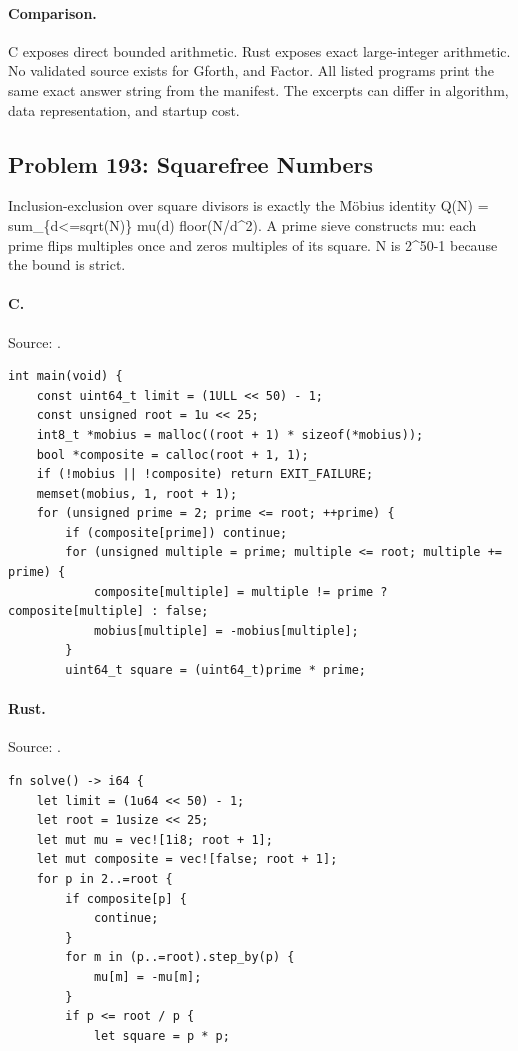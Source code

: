 \paragraph{Comparison.}
C exposes direct bounded arithmetic. Rust exposes exact large-integer arithmetic.
No validated source exists for Gforth, and Factor.
All listed programs print the same exact answer string from the manifest. The excerpts can differ in algorithm, data representation, and startup cost.

\subsection{Problem 193: Squarefree Numbers}
\label{walkthrough:p193}
Inclusion-exclusion over square divisors is exactly the Möbius identity Q(N) = sum\_\{d<=sqrt(N)\} mu(d) floor(N/d\textasciicircum{}2). A prime sieve constructs mu: each prime flips multiples once and zeros multiples of its square. N is 2\textasciicircum{}50-1 because the bound is strict.

\paragraph{C.} Source: .
\begin{lstlisting}
int main(void) {
    const uint64_t limit = (1ULL << 50) - 1;
    const unsigned root = 1u << 25;
    int8_t *mobius = malloc((root + 1) * sizeof(*mobius));
    bool *composite = calloc(root + 1, 1);
    if (!mobius || !composite) return EXIT_FAILURE;
    memset(mobius, 1, root + 1);
    for (unsigned prime = 2; prime <= root; ++prime) {
        if (composite[prime]) continue;
        for (unsigned multiple = prime; multiple <= root; multiple += prime) {
            composite[multiple] = multiple != prime ? composite[multiple] : false;
            mobius[multiple] = -mobius[multiple];
        }
        uint64_t square = (uint64_t)prime * prime;
\end{lstlisting}

\paragraph{Rust.} Source: .
\begin{lstlisting}
fn solve() -> i64 {
    let limit = (1u64 << 50) - 1;
    let root = 1usize << 25;
    let mut mu = vec![1i8; root + 1];
    let mut composite = vec![false; root + 1];
    for p in 2..=root {
        if composite[p] {
            continue;
        }
        for m in (p..=root).step_by(p) {
            mu[m] = -mu[m];
        }
        if p <= root / p {
            let square = p * p;
\end{lstlisting}

